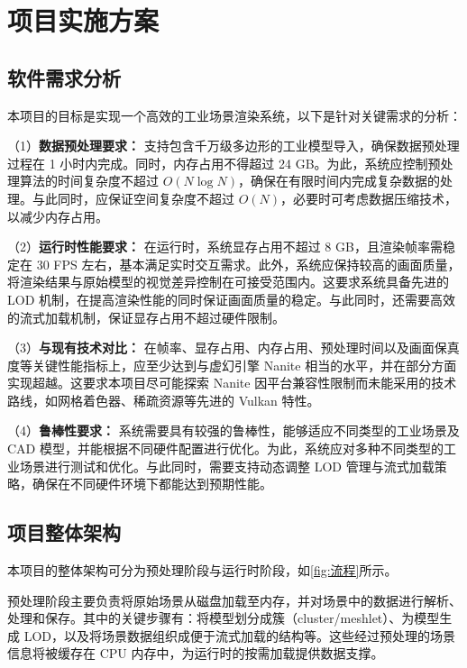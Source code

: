 \cleardoublepage

\section{项目实施方案}

\subsection{软件需求分析}

本项目的目标是实现一个高效的工业场景渲染系统，以下是针对关键需求的分析：

\par （1）\textbf{数据预处理要求：}  
支持包含千万级多边形的工业模型导入，确保数据预处理过程在 1 小时内完成。同时，内存占用不得超过 24 GB。为此，系统应控制预处理算法的时间复杂度不超过 $O(N\log N)$，确保在有限时间内完成复杂数据的处理。与此同时，应保证空间复杂度不超过 $O(N)$，必要时可考虑数据压缩技术，以减少内存占用。

\par （2）\textbf{运行时性能要求：}  
在运行时，系统显存占用不超过 8 GB，且渲染帧率需稳定在 30 FPS 左右，基本满足实时交互需求。此外，系统应保持较高的画面质量，将渲染结果与原始模型的视觉差异控制在可接受范围内。这要求系统具备先进的 LOD 机制，在提高渲染性能的同时保证画面质量的稳定。与此同时，还需要高效的流式加载机制，保证显存占用不超过硬件限制。

\par （3）\textbf{与现有技术对比：}  
在帧率、显存占用、内存占用、预处理时间以及画面保真度等关键性能指标上，应至少达到与虚幻引擎 Nanite 相当的水平，并在部分方面实现超越。这要求本项目尽可能探索 Nanite 因平台兼容性限制而未能采用的技术路线，如网格着色器、稀疏资源等先进的 Vulkan 特性。

\par （4）\textbf{鲁棒性要求：}  
系统需要具有较强的鲁棒性，能够适应不同类型的工业场景及 CAD 模型，并能根据不同硬件配置进行优化。为此，系统应对多种不同类型的工业场景进行测试和优化。与此同时，需要支持动态调整 LOD 管理与流式加载策略，确保在不同硬件环境下都能达到预期性能。

\subsection{项目整体架构}

\par 本项目的整体架构可分为预处理阶段与运行时阶段，如\autoref{fig:流程}所示。

预处理阶段主要负责将原始场景从磁盘加载至内存，并对场景中的数据进行解析、处理和保存。其中的关键步骤有：将模型划分成簇（cluster/meshlet）、为模型生成 LOD，以及将场景数据组织成便于流式加载的结构等。这些经过预处理的场景信息将被缓存在 CPU 内存中，为运行时的按需加载提供数据支撑。


